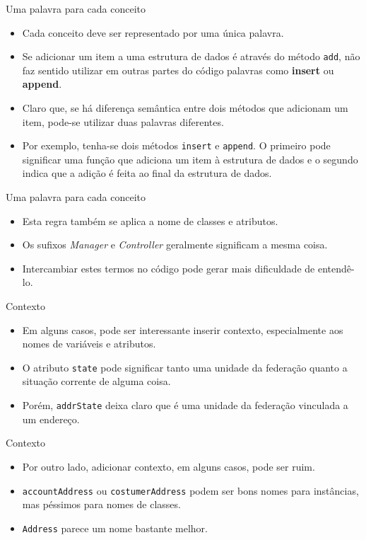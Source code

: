 \documentclass[11pt]{beamer}
\begin{document}
  \begin{frame}[fragile]{Uma palavra para cada conceito}
    \begin{itemize}
      \item Cada conceito deve ser representado por uma única palavra.
      \item Se adicionar um item a uma estrutura de dados é através do método \verb|add|, não faz sentido utilizar em outras partes do código palavras como \textbf{insert} ou \textbf{append}.
      \item Claro que, se há diferença semântica entre dois métodos que adicionam um item, pode-se utilizar duas palavras diferentes.
      \item Por exemplo, tenha-se dois métodos \verb|insert| e \verb|append|. O primeiro pode significar uma função que adiciona um item à estrutura de dados e o segundo indica que a adição é feita ao final da estrutura de dados.
    \end{itemize}
  \end{frame}

  \begin{frame}{Uma palavra para cada conceito}
    \begin{itemize}
      \item Esta regra também se aplica a nome de classes e atributos.
      \item Os sufixos \textit{Manager} e \textit{Controller} geralmente significam a mesma coisa.
      \item Intercambiar estes termos no código pode gerar mais dificuldade de entendê-lo.
    \end{itemize}
  \end{frame}

  \begin{frame}[fragile]{Contexto}
    \begin{itemize}
      \item Em alguns casos, pode ser interessante inserir contexto, especialmente aos nomes de variáveis e atributos. 
      \item O atributo \verb|state| pode significar tanto uma unidade da federação quanto a situação corrente de alguma coisa.
      \item Porém, \verb|addrState| deixa claro que é uma unidade da federação vinculada a um endereço.
    \end{itemize}
  \end{frame}

  \begin{frame}[fragile]{Contexto}
    \begin{itemize}
      \item Por outro lado, adicionar contexto, em alguns casos, pode ser ruim.
      \item \verb|accountAddress| ou \verb|costumerAddress| podem ser bons nomes para instâncias, mas péssimos para nomes de classes.
      \item \verb|Address| parece um nome bastante melhor.
    \end{itemize}
  \end{frame}
\end{document}
